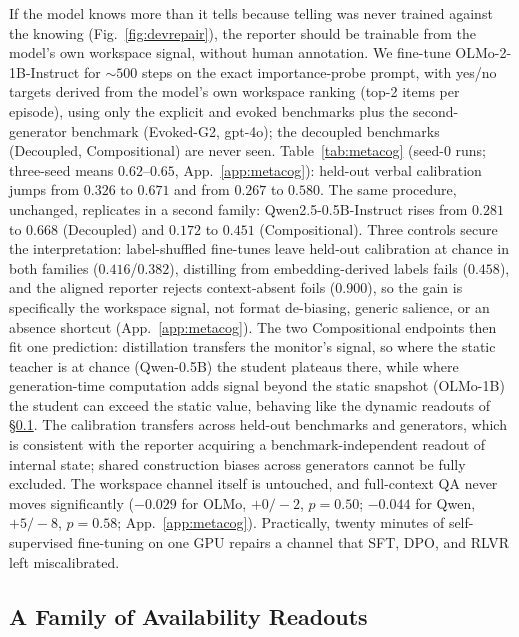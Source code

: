 If the model knows more than it tells because telling was never trained
against the knowing (Fig.~\ref{fig:devrepair}), the reporter should be
trainable from the model's own workspace signal, without human annotation. We fine-tune OLMo-2-1B-Instruct for ${\sim}500$ steps on
the exact importance-probe prompt, with yes/no targets derived from the model's
own workspace ranking (top-2 items per episode), using only the explicit and
evoked benchmarks plus the second-generator benchmark (Evoked-G2, gpt-4o); the decoupled benchmarks
(Decoupled, Compositional) are never seen. Table~\ref{tab:metacog} (seed-0 runs; three-seed means $0.62$--$0.65$,
App.~\ref{app:metacog}): held-out verbal calibration jumps from $0.326$ to
$0.671$ and from $0.267$ to $0.580$. The same procedure,
unchanged, replicates in a second family: Qwen2.5-0.5B-Instruct rises from
$0.281$ to $0.668$ (Decoupled) and $0.172$ to $0.451$ (Compositional).
Three controls secure the interpretation: label-shuffled fine-tunes leave
held-out calibration at chance in both families ($0.416$/$0.382$),
distilling from embedding-derived labels fails ($0.458$), and the aligned
reporter rejects context-absent foils ($0.900$), so the gain is specifically
the workspace signal, not format de-biasing, generic salience, or an absence
shortcut (App.~\ref{app:metacog}). The two Compositional endpoints then fit one
prediction: distillation transfers the monitor's signal, so where the static
teacher is at chance (Qwen-0.5B) the student plateaus there, while where
generation-time computation adds signal beyond the static snapshot (OLMo-1B)
the student can exceed the static value, behaving like the dynamic readouts
of \S\ref{sec:family}. The calibration
transfers across held-out benchmarks and generators, which is consistent with the
reporter acquiring a benchmark-independent readout of internal state; shared
construction biases across generators cannot be fully excluded. The workspace channel itself is untouched, and
full-context QA never moves significantly ($-0.029$ for OLMo, $+0/-2$,
$p{=}0.50$; $-0.044$ for Qwen, $+5/-8$, $p{=}0.58$; App.~\ref{app:metacog}). Practically, twenty minutes of self-supervised fine-tuning on one GPU repairs
a channel that SFT, DPO, and RLVR left miscalibrated.

\subsection{A Family of Availability Readouts}
\label{sec:family}



